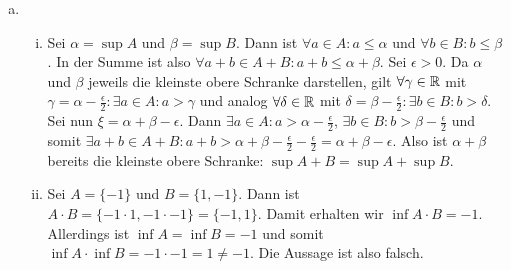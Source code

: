 \documentclass{article}
\begin{document}
\begin{enumerate}[(a)]
	\item 
	\begin{enumerate}[(i)]
		\item Sei $\alpha = \sup A$ und $\beta = \sup B$. Dann ist $\forall a\in A: a\leq \alpha$ und $\forall b\in B: b\leq \beta$. In der Summe ist also $\forall a+b \in A+B: a + b \leq \alpha + \beta$. Sei $\epsilon > 0$. Da $\alpha$ und $\beta$ jeweils die kleinste obere Schranke darstellen,  gilt $\forall \gamma \in \mathbb{R}$ mit $\gamma = \alpha - \frac{\epsilon}{2}: \exists a \in A: a > \gamma$ und analog $\forall \delta \in \mathbb{R}$ mit $\delta = \beta - \frac{\epsilon}{2}: \exists b \in B: b > \delta$.
		Sei nun $\xi = \alpha + \beta - \epsilon$. Dann $\exists a\in A: a > \alpha - \frac{\epsilon}{2}$, $\exists b\in B: b > \beta - \frac{\epsilon}{2}$ und somit $\exists a + b \in A+B: a + b > \alpha + \beta - \frac{\epsilon}{2} - \frac{\epsilon}{2} = \alpha + \beta - \epsilon$. Also ist $\alpha + \beta$ bereits die kleinste obere Schranke: $\sup A+ B = \sup A + \sup B$.
		\item Sei $A = \{-1\}$ und $B = \{1,-1\}$. Dann ist $A\cdot B = \{-1\cdot 1, -1\cdot -1\} = \{-1, 1\}$. Damit erhalten wir $\inf A\cdot B = -1$. Allerdings ist $\inf A = \inf B = -1$ und somit $\inf A \cdot \inf B = -1\cdot -1 = 1\neq -1$. Die Aussage ist also falsch.
	\end{enumerate}
	\end{enumerate}
\end{document}
